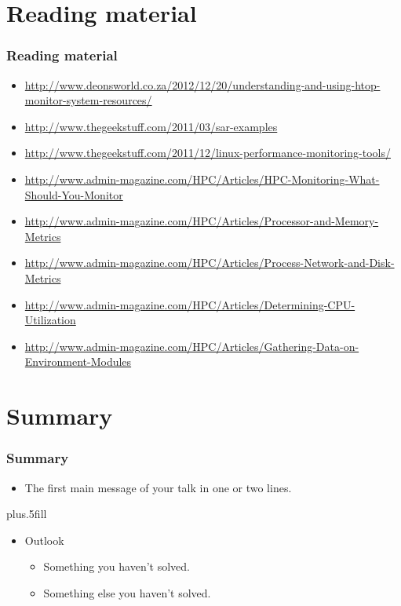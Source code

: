\documentclass[aspectratio=1610]{beamer}
\begin{document}
\section{Reading material}
\begin{frame}
  \frametitle{Reading material}
  \begin{itemize}
    \item
    \textcolor{vscBlueGreen}{\url{http://www.deonsworld.co.za/2012/12/20/understanding-and-using-htop-monitor-system-resources/}}
    \item
    \textcolor{vscBlueGreen}{\url{http://www.thegeekstuff.com/2011/03/sar-examples}}
    \item
    \textcolor{vscBlueGreen}{\url{http://www.thegeekstuff.com/2011/12/linux-performance-monitoring-tools/}}
    \item
    \textcolor{vscBlueGreen}{\url{http://www.admin-magazine.com/HPC/Articles/HPC-Monitoring-What-Should-You-Monitor}}
    \item
    \textcolor{vscBlueGreen}{\url{http://www.admin-magazine.com/HPC/Articles/Processor-and-Memory-Metrics}}
    \item
    \textcolor{vscBlueGreen}{\url{http://www.admin-magazine.com/HPC/Articles/Process-Network-and-Disk-Metrics}}
    \item
    \textcolor{vscBlueGreen}{\url{http://www.admin-magazine.com/HPC/Articles/Determining-CPU-Utilization}}
    \item
    \textcolor{vscBlueGreen}{\url{http://www.admin-magazine.com/HPC/Articles/Gathering-Data-on-Environment-Modules}}
  \end{itemize}
\end{frame}

\section*{Summary}

\begin{frame}
  \frametitle<presentation>{Summary}
  
  \begin{itemize}
    \item The \alert{first main message} of your talk in one or two lines.
  \end{itemize}
  
  \vskip0pt plus.5fill
  \begin{itemize}
    \item Outlook
    \begin{itemize}
      \item Something you haven't solved.
      \item Something else you haven't solved.
    \end{itemize}
  \end{itemize}
\end{frame}
\end{document}
